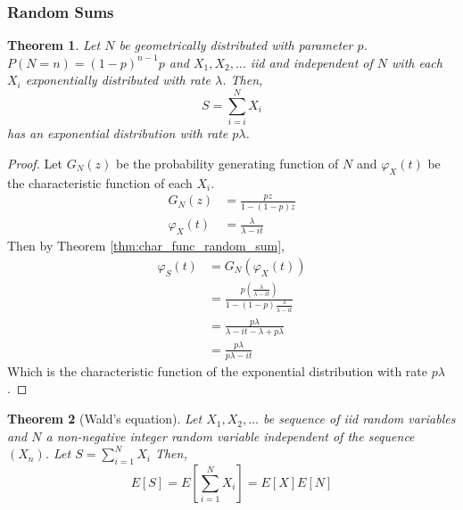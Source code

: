 \documentclass{article}
\theoremstyle{plain}
\newtheorem{theorem}{Theorem}[section]
\theoremstyle{definition}
\theoremstyle{remark}
\begin{document}
\subsubsection{Random Sums}

\begin{theorem} \label{thm:geom_sum_exp}
Let $N$ be geometrically distributed with parameter $p$.
$P(N = n) = (1 - p)^{n - 1} p$ and $X_1,X_2,\ldots$ iid and independent of $N$ with each $X_i$ exponentially distributed with rate $\lambda$.
Then,
$$
S = \sum_{i = i}^N X_i
$$
has an exponential distribution with rate $p \lambda$.
\end{theorem}

\begin{proof}
Let $G_N(z)$ be the probability generating function of $N$ and $\varphi_X(t)$ be the characteristic function of each $X_i$.
\begin{align*}
    G_N(z) &= \frac{pz}{1 - (1 - p)z}\\
    \varphi_X(t) &= \frac{\lambda}{\lambda - it}
\end{align*}
Then by Theorem \ref{thm:char_func_random_sum},
\begin{align*}
    \varphi_S(t) &= G_N(\varphi_X(t))\\
    &= \frac{
        p \left( \frac{\lambda}{\lambda - it} \right)
        } {
        1 - (1 - p) \frac{\lambda}{\lambda - it}
        }\\
    &= \frac{ 
        p \lambda
    } {
        \lambda - it - \lambda + p \lambda
    }\\
    &= \frac{ 
        p \lambda
    } {
        p \lambda - it 
    }
\end{align*}
Which is the characteristic function of the exponential distribution with rate $p \lambda$.
\end{proof}

\begin{theorem}[Wald's equation]\label{thm:random_sum_ev} \cite{Ross97}
Let $X_1, X_2, \ldots$ be sequence of iid random variables and $N$ a non-negative integer random variable independent of the sequence $(X_n)$.
Let $S = \sum_{i = 1}^N X_i$
Then,
$$
E[ S ] = E\left[\sum_{i = 1}^N X_i\right] = E[X] E[N]
$$
\end{theorem}
\end{document}
